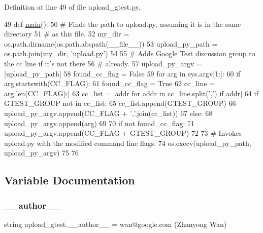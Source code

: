 Definition at line 49 of file upload\+\_\+gtest.\+py.


\begin{DoxyCode}
49 \textcolor{keyword}{def }\hyperlink{namespaceupload__gtest_ab5bef7b968c54c632a52c1b4a3d37bdd}{main}():
50   \textcolor{comment}{# Finds the path to upload.py, assuming it is in the same directory}
51   \textcolor{comment}{# as this file.}
52   my\_dir = os.path.dirname(os.path.abspath(\_\_file\_\_))
53   upload\_py\_path = os.path.join(my\_dir, \textcolor{stringliteral}{'upload.py'})
54 
55   \textcolor{comment}{# Adds Google Test discussion group to the cc line if it's not there}
56   \textcolor{comment}{# already.}
57   upload\_py\_argv = [upload\_py\_path]
58   found\_cc\_flag = \textcolor{keyword}{False}
59   \textcolor{keywordflow}{for} arg \textcolor{keywordflow}{in} sys.argv[1:]:
60     \textcolor{keywordflow}{if} arg.startswith(CC\_FLAG):
61       found\_cc\_flag = \textcolor{keyword}{True}
62       cc\_line = arg[len(CC\_FLAG):]
63       cc\_list = [addr \textcolor{keywordflow}{for} addr \textcolor{keywordflow}{in} cc\_line.split(\textcolor{stringliteral}{','}) \textcolor{keywordflow}{if} addr]
64       \textcolor{keywordflow}{if} GTEST\_GROUP \textcolor{keywordflow}{not} \textcolor{keywordflow}{in} cc\_list:
65         cc\_list.append(GTEST\_GROUP)
66       upload\_py\_argv.append(CC\_FLAG + \textcolor{stringliteral}{','}.join(cc\_list))
67     \textcolor{keywordflow}{else}:
68       upload\_py\_argv.append(arg)
69 
70   \textcolor{keywordflow}{if} \textcolor{keywordflow}{not} found\_cc\_flag:
71     upload\_py\_argv.append(CC\_FLAG + GTEST\_GROUP)
72 
73   \textcolor{comment}{# Invokes upload.py with the modified command line flags.}
74   os.execv(upload\_py\_path, upload\_py\_argv)
75 
76 
\end{DoxyCode}


\subsection{Variable Documentation}
\mbox{\label{namespaceupload__gtest_ae7f6ee6ec8f85faa6fb72465afce7c0d}} 
\subsubsection{\texorpdfstring{\+\_\+\+\_\+author\+\_\+\+\_\+}{\_\_author\_\_}}
{\footnotesize\ttfamily string upload\+\_\+gtest.\+\_\+\+\_\+author\+\_\+\+\_\+ = \textquotesingle{}wan@google.\+com (Zhanyong Wan)\textquotesingle{}\hspace{0.3cm}{\ttfamily [private]}}



